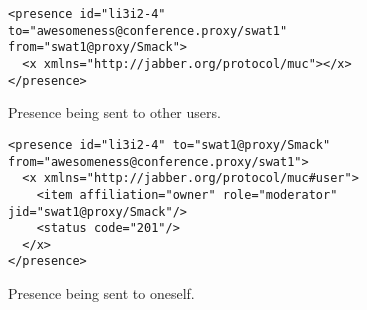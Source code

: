 \documentclass{article}
\begin{document}
\begin{figure}
\begin{verbatim}
<presence id="li3i2-4" to="awesomeness@conference.proxy/swat1" from="swat1@proxy/Smack">
  <x xmlns="http://jabber.org/protocol/muc"></x>
</presence>
\end{verbatim}
\caption{Presence being sent to other users.}
\label{fig:XMUM-presence}
\end{figure}


\begin{figure}
\begin{verbatim}
<presence id="li3i2-4" to="swat1@proxy/Smack" from="awesomeness@conference.proxy/swat1">
  <x xmlns="http://jabber.org/protocol/muc#user">
    <item affiliation="owner" role="moderator" jid="swat1@proxy/Smack"/>
    <status code="201"/>
  </x>
</presence>
\end{verbatim}
\caption{Presence being sent to oneself.}
\label{fig:XMUM-self-presence}
\end{figure}
\end{document}
